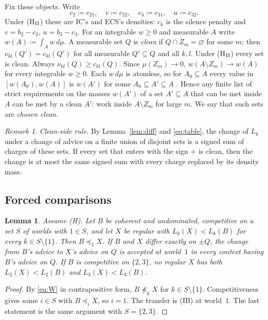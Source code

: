 \documentclass[11pt]{article}
\newtheorem{lemma}[theorem]{Lemma}
\theoremstyle{definition}\newtheorem{definition}[theorem]{Definition}
\theoremstyle{remark}\newtheorem{remark}[theorem]{Remark}
\begin{document}
Fix these objects. Write
\[
 c_2\coloneqq c_{21},\quad v\coloneqq c_{22},\quad c_3\coloneqq c_{31},\quad
 u\coloneqq c_{32}.
\]
Under (H$_{\rm II}$) these are IC's and ECS's densities: $c_k$ is the silence
penalty and $v=b_2-c_2$, $u=b_3-c_3$. For an integrable $w\ge0$ and
measurable $A$ write $w(A)\coloneqq\int_Aw\,d\mu$. A measurable set $Q$ is
\emph{clean} if $Q\cap Z_m=\varnothing$ for some $m$; then
$\nu_{kl}(Q')=c_{kl}(Q')$ for all measurable $Q'\subseteq Q$ and all $k,l$.
Under (H$_{\rm II}$) every set is clean. Always
$\nu_{kl}(Q)\ge c_{kl}(Q)$. Since $\mu(Z_m)\to0$, $w(A\setminus Z_m)\to w(A)$
for every integrable $w\ge0$. Each $w\,d\mu$ is atomless, so for
$A_0\subseteq A$ every value in $[w(A_0),w(A)]$ is $w(A')$ for some
$A_0\subseteq A'\subseteq A$ \cite{Sierpinski}. Hence any finite list of
strict requirements on the masses $w(A')$ of a set $A'\subseteq A$ that can
be met inside $A$ can be met by a clean $A'$: work inside $A\setminus Z_m$
for large $m$. We say that such sets are \emph{chosen clean}.

\begin{remark}\label{rem:cleanside}
\emph{Clean-side rule.} By Lemma~\ref{lem:diff} and \eqref{eq:table}, the
change of $L_k$ under a change of advice on a finite union of disjoint sets
is a signed sum of charges of these sets. If every set that enters with the
sign $+$ is clean, then the change is at most the same signed sum with every
charge replaced by its density mass.
\end{remark}

\subsection{Forced comparisons}

\begin{lemma}\label{lem:forced}
Assume (H). Let $B$ be coherent and undominated, competitive on a set $S$ of
worlds with $1\in S$, and let $X$ be regular with $L_k(X)<L_k(B)$ for every
$k\in S\setminus\{1\}$. Then $B\preceq_1X$. If $B$ and $X$ differ exactly on
$\pm Q$, the change from $B$'s advice to $X$'s advice on $Q$ is accepted at
world~$1$ in every context having $B$'s advice on $Q$. If $B$ is competitive
on $\{2,3\}$, no regular $X$ has both $L_2(X)<L_2(B)$ and $L_3(X)<L_3(B)$.
\end{lemma}
\begin{proof}
By \eqref{eq:W} in contrapositive form, $B\not\preceq_kX$ for $k\in
S\setminus\{1\}$. Competitiveness gives some $i\in S$ with $B\preceq_iX$, so
$i=1$. The transfer is (IB) at world~$1$. The last statement is the same
argument with $S=\{2,3\}$.
\end{proof}
\end{document}
